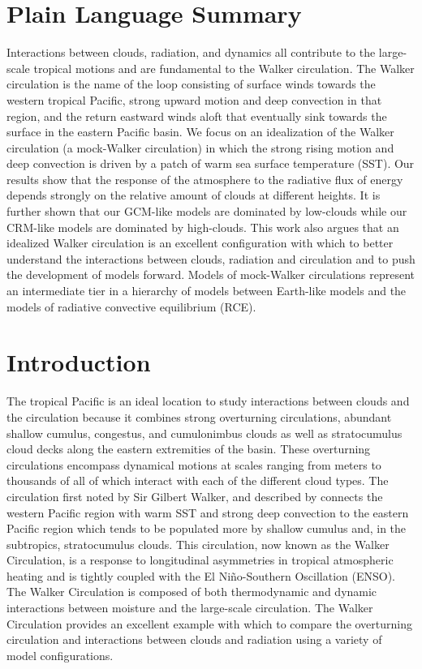 \documentclass[draft]{agujournal2019}
\begin{document}
\section*{Plain Language Summary}
Interactions between clouds, radiation, and dynamics all contribute
to the large-scale tropical motions and are fundamental to the Walker circulation.  
The Walker circulation is the name of the loop consisting of surface winds towards the western tropical Pacific, 
strong upward motion and deep convection in that region,  and the return eastward winds aloft that 
eventually sink towards the surface in the eastern Pacific basin.  
We focus on an idealization of the Walker circulation (a mock-Walker circulation) 
in which the strong rising motion and deep convection is driven by a patch of warm sea surface temperature (SST).  
Our results show that the response of the atmosphere to the 
radiative flux of energy depends strongly on the relative amount of clouds at different heights.   
It is further shown that our GCM-like models are dominated by low-clouds while our CRM-like models 
are dominated by high-clouds.  This work also argues that an idealized Walker circulation is an 
excellent configuration with which to better understand the interactions between clouds, radiation and circulation 
and to push the development of models forward.   Models of mock-Walker circulations represent
an intermediate tier in a hierarchy of models between Earth-like models and the models of 
radiative convective equilibrium (RCE).  


\section{Introduction}

The tropical Pacific is an ideal location to study interactions between clouds and the circulation 
because it combines strong overturning circulations, abundant shallow cumulus, congestus, and cumulonimbus 
clouds \cite{Johnson1999} as well as stratocumulus cloud decks along the eastern extremities of the basin.
These overturning circulations encompass dynamical motions at scales
ranging from meters to thousands of  all of which interact with each of the different cloud types.
The circulation first noted by Sir Gilbert Walker, and described by  connects the 
western Pacific region with warm SST and strong deep convection to the eastern Pacific region which tends to 
be populated more by shallow cumulus and, in the subtropics, stratocumulus clouds.  
This circulation, now known as the Walker Circulation, is a response to  
longitudinal asymmetries in  tropical atmospheric heating and is tightly coupled with 
the El Ni\~{n}o-Southern Oscillation (ENSO).    
The Walker Circulation  
{is composed}
of both thermodynamic and dynamic interactions
between moisture and the large-scale circulation.  
{The Walker Circulation provides an excellent example with which to compare the overturning circulation and interactions between clouds and radiation using a variety of model configurations.}
\end{document}
